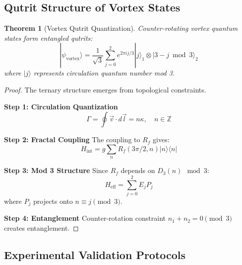 \documentclass[11pt]{article}
\newtheorem{theorem}{Theorem}[section]
\theoremstyle{definition}
\begin{document}
\subsection{Qutrit Structure of Vortex States}

\begin{theorem}[Vortex Qutrit Quantization]
Counter-rotating vortex quantum states form entangled qutrits:
\begin{equation}
|\psi_{\text{vortex}}\rangle = \frac{1}{\sqrt{3}} \sum_{j=0}^{2} e^{2\pi ij/3} |j\rangle_1 \otimes |3-j \bmod 3\rangle_2
\end{equation}
where $|j\rangle$ represents circulation quantum number mod 3.
\end{theorem}

\begin{proof}
The ternary structure emerges from topological constraints.

\textbf{Step 1: Circulation Quantization}
\begin{equation}
\Gamma = \oint \vec{v} \cdot d\vec{l} = n\kappa, \quad n \in \mathbb{Z}
\end{equation}

\textbf{Step 2: Fractal Coupling}
The coupling to $R_f$ gives:
\begin{equation}
H_{\text{int}} = g \sum_n R_f(3\pi/2, n) |n\rangle\langle n|
\end{equation}

\textbf{Step 3: Mod 3 Structure}
Since $R_f$ depends on $D_3(n) \mod 3$:
\begin{equation}
H_{\text{eff}} = \sum_{j=0}^{2} E_j P_j
\end{equation}
where $P_j$ projects onto $n \equiv j \pmod{3}$.

\textbf{Step 4: Entanglement}
Counter-rotation constraint $n_1 + n_2 = 0 \pmod{3}$ creates entanglement.
\end{proof}

\subsection{Experimental Validation Protocols}
\end{document}

